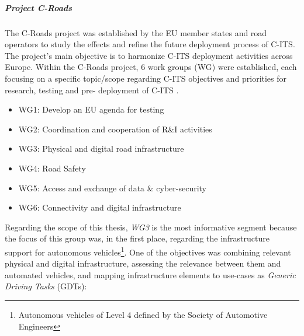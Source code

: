 \documentclass[0main.tex]{subfiles}
\begin{document}

\subparagraph{Project C-Roads}\label{sec-croads}

The C-Roads project was established by the EU member states and road operators to study the
effects and refine the future deployment process of C-ITS.  The project's main objective is to
harmonize C-ITS deployment activities across Europe.  Within the C-Roads project, 6 work groups
(WG) were established, each focusing on a specific topic/scope regarding C-ITS objectives and
priorities for research, testing and pre- deployment of C-ITS \cite{Commision2021}. 

\begin{itemize}
    \item WG1: Develop an EU agenda for testing
    \item WG2: Coordination and cooperation of R\&I activities
    \item WG3: Physical and digital road infrastructure
    \item WG4: Road Safety
    \item WG5: Access and exchange of data \& cyber-security
    \item WG6: Connectivity and digital infrastructure
\end{itemize}

Regarding the scope of this thesis, \emph{WG3} is the most informative segment because the focus of
this group was, in the first place, regarding the infrastructure support for autonomous
vehicles\footnote{Autonomous vehicles of Level 4 defined by the Society of Automotive
Engineers}. One of the objectives was combining relevant physical and digital infrastructure,
assessing the relevance between them and automated vehicles, and mapping infrastructure
elements to use-cases as \emph{Generic Driving Tasks} (GDTs):
\end{document}
